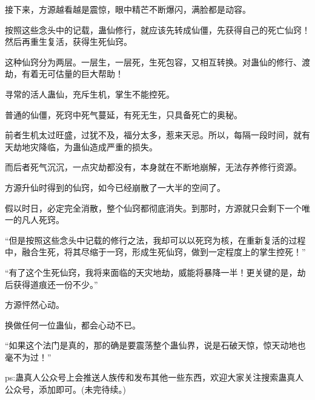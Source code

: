 \begin{this_body}
接下来，方源越看越是震惊，眼中精芒不断爆闪，满脸都是动容。

按照这些念头中的记载，蛊仙修行，就应该先转成仙僵，先获得自己的死亡仙窍！然后再重生复活，获得生死仙窍。

这种仙窍分为两层。一层生，一层死，生死包容，又相互转换。对蛊仙的修行、渡劫，有着无可估量的巨大帮助！

寻常的活人蛊仙，充斥生机，掌生不能控死。

普通的仙僵，死窍中死气蔓延，有死无生，只具备死亡的奥秘。

前者生机太过旺盛，过犹不及，福分太多，惹来天忌。所以，每隔一段时间，就有天劫地灾降临，为蛊仙造成严重的损失。

而后者死气沉沉，一点灾劫都没有，本身就在不断地崩解，无法存养修行资源。

方源升仙时得到的仙窍，如今已经崩散了一大半的空间了。

假以时日，必定完全消散，整个仙窍都彻底消失。到那时，方源就只会剩下一个唯一的凡人死窍。

“但是按照这些念头中记载的修行之法，我却可以以死窍为核，在重新复活的过程中，融合生死，将其尽缩于一窍，形成生死仙窍，做到一定程度上的掌生控死！”

“有了这个生死仙窍，我将来面临的天灾地劫，威能将暴降一半！更关键的是，劫后获得道痕还一份不少。”

方源怦然心动。

换做任何一位蛊仙，都会心动不已。

“如果这个法门是真的，那的确是要震荡整个蛊仙界，说是石破天惊，惊天动地也毫不为过！”

ps:蛊真人公众号上会推送人族传和发布其他一些东西，欢迎大家关注搜索蛊真人公众号，添加即可。(未完待续。)

\end{this_body}

